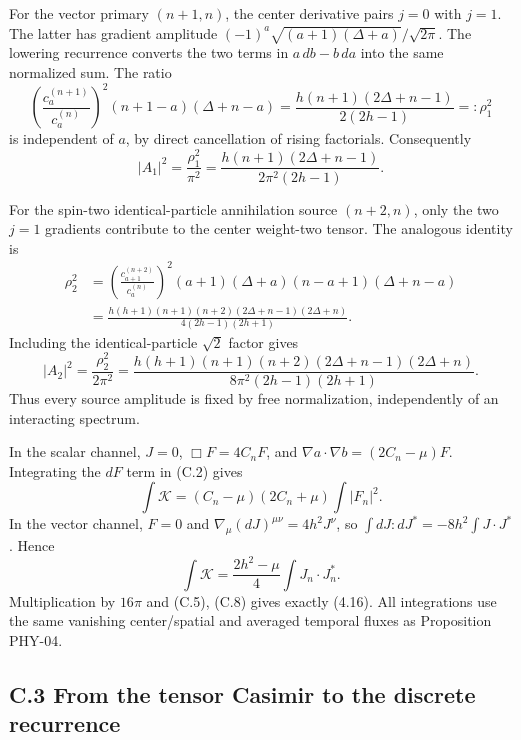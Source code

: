For the vector primary \((n+1,n)\), the center derivative pairs \(j=0\) with \(j=1\). The latter has gradient amplitude \((-1)^a\sqrt{(a+1)(\Delta+a)}/\sqrt{2\pi}\). The lowering recurrence converts the two terms in \(a\,db-b\,da\) into the same normalized sum. The ratio \[
\left(\frac{c_a^{(n+1)}}{c_a^{(n)}}\right)^2
(n+1-a)(\Delta+n-a)
=\frac{h(n+1)(2\Delta+n-1)}{2(2h-1)}
=:\rho_1^2
\tag{C.7}
\] is independent of \(a\), by direct cancellation of rising factorials. Consequently \[
|A_1|^2=\frac{\rho_1^2}{\pi^2}
=\frac{h(n+1)(2\Delta+n-1)}
{2\pi^2(2h-1)} .
\tag{C.8}
\]

For the spin-two identical-particle annihilation source \((n+2,n)\), only the two \(j=1\) gradients contribute to the center weight-two tensor. The analogous identity is \[
\begin{aligned}
\rho_2^2&=
\left(\frac{c_{a+1}^{(n+2)}}{c_a^{(n)}}\right)^2
(a+1)(\Delta+a)(n-a+1)(\Delta+n-a)
\\&=\frac{h(h+1)(n+1)(n+2)(2\Delta+n-1)(2\Delta+n)}
{4(2h-1)(2h+1)}
.
\end{aligned}
\tag{C.9}
\] Including the identical-particle \(\sqrt2\) factor gives \[
|A_2|^2=\frac{\rho_2^2}{2\pi^2}
=\frac{h(h+1)(n+1)(n+2)(2\Delta+n-1)(2\Delta+n)}
{8\pi^2(2h-1)(2h+1)} .
\tag{C.10}
\] Thus every source amplitude is fixed by free normalization, independently of an interacting spectrum.

In the scalar channel, \(J=0\), \(\Box F=4C_nF\), and \(\nabla a\cdot\nabla b=(2C_n-\mu)F\). Integrating the \(dF\) term in (C.2) gives \[
\int\mathcal K=(C_n-\mu)(2C_n+\mu)\int|F_n|^2 .
\] In the vector channel, \(F=0\) and \(\nabla_\mu(dJ)^{\mu\nu}=4h^2J^\nu\), so \(\int dJ:dJ^*=-8h^2\int J\cdot J^*\). Hence \[
\int\mathcal K=\frac{2h^2-\mu}{4}\int J_n\cdot J_n^* .
\tag{C.11}
\] Multiplication by \(16\pi\) and (C.5), (C.8) gives exactly (4.16). All integrations use the same vanishing center/spatial and averaged temporal fluxes as Proposition PHY-04.

\hypertarget{c.3-from-the-tensor-casimir-to-the-discrete-recurrence}{%
\subsection{C.3 From the tensor Casimir to the discrete recurrence}\label{c.3-from-the-tensor-casimir-to-the-discrete-recurrence}}

